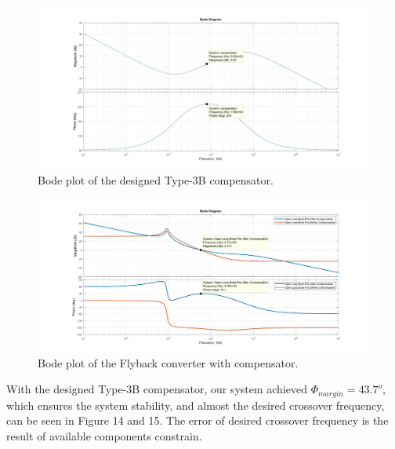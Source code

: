 \documentclass{article}
\begin{document}
\begin{figure}[H]
    \centering
    \includegraphics[scale=0.2]{compansator.jpg}
    \caption{Bode plot of the designed Type-3B compensator.}
    \label{fig:my_label}
\end{figure}
\begin{figure}[H]
    \centering
    \includegraphics[scale=0.2]{after compensation.jpg}
    \caption{Bode plot of the Flyback converter with compensator.}
    \label{fig:my_label}
\end{figure}

With the designed Type-3B compensator, our system achieved $\Phi_{margin}=43.7^o$, which ensures the system stability, and  almost the desired crossover frequency, can be seen in Figure 14 and 15. The error of desired crossover frequency is the result of available components constrain. 
\end{document}
